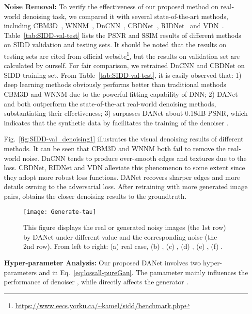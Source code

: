 \documentclass[runningheads]{llncs}
\begin{document}
\vspace{2mm}\noindent\textbf{Noise Removal:}
To verify the effectiveness of our proposed method on real-world denoising task, we compared it
with several state-of-the-art methods, including CBM3D~\cite{dabov2007image}, WNNM~\cite{gu2014weighted},
DnCNN~\cite{zhang2017beyond}, CBDNet~\cite{guo2019toward}, RIDNet~\cite{anwar2019real} and
VDN~\cite{yue2019variational}. Table~\ref{tab:SIDD-val-test}
lists the PSNR and SSIM results of different methods on SIDD validation and testing sets. It should be noted that
the results on testing sets are cited from official
website\footnote{\url{https://www.eecs.yorku.ca/~kamel/sidd/benchmark.php}}, but the results on validation set are calculated
by ourself. For fair comparison, we retrained DnCNN and CBDNet on SIDD training set.
From Table~\ref{tab:SIDD-val-test},
it is easily observed that: 1) deep learning methods obviously performs better than traditional
methods CBM3D and WNNM due to the powerful fitting capability
of DNN; 2) DANet and  both outperform the state-of-the-art real-world denoising
methods, substantiating their effectiveness;
3)  surpasses DANet about 0.18dB PSNR, which indicates that the synthetic data by  facilitates
the training of the denoiser .

Fig.~\ref{fig:SIDD-val_denoising1} illustrates the visual denoising results of different methods. It can be seen that
CBM3D and WNNM both fail to remove the real-world noise. DnCNN tends to produce over-smooth edges and textures
due to the  loss. CBDNet, RIDNet and VDN alleviate this phenomenon to some extent since they adopt more robust loss
functions.
DANet recovers sharper edges and more details owning to the
adversarial loss.
After retraining with
more generated image pairs,  obtains the closer denoising results to the groundtruth.
\begin{figure}[t]
    \centering
    \texttt{[image: Generate-tau]}
    \vspace{-3mm}
    \caption{This figure displays the real or generated noisy images (the 1st row) by DANet under different 
    value and the corresponding noise (the 2nd row). From left to right: (a) real case, (b) , (c) ,
    (d) , (e) , (f) .}
    \label{fig:generate-tau}
\end{figure}

\vspace{2mm}\noindent\textbf{Hyper-parameter Analysis:} 
Our proposed DANet involves two hyper-parameters  and  in Eq.~\eqref{eq:lossall-pureGan}. The
pamameter  mainly influences the performance of denoiser , while  directly affects the
generator .
\end{document}
